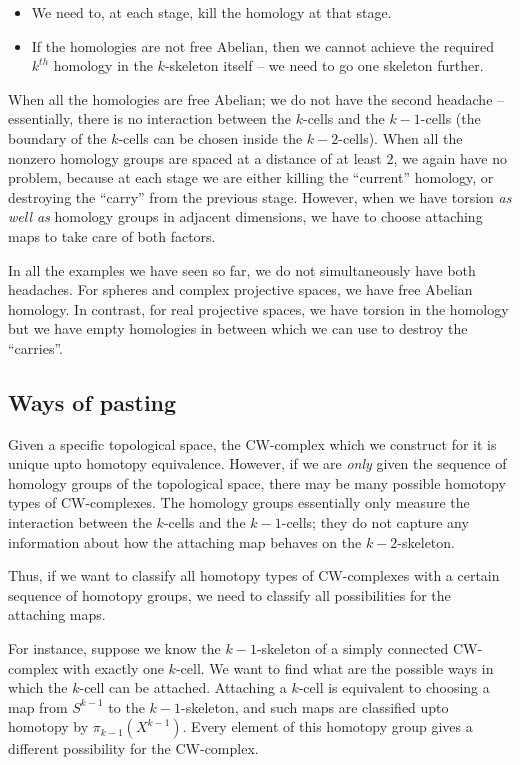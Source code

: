 \documentclass[a4paper]{amsart}
\begin{document}
\begin{itemize}

\item We need to, at each stage, kill the homology at that stage.

\item If the homologies are not free Abelian, then we cannot achieve
  the required $k^{th}$ homology in the $k$-skeleton itself -- we need
  to go one skeleton further.

\end{itemize}

When all the homologies are free Abelian; we do not have the second
headache -- essentially, there is no interaction between the $k$-cells
and the $k-1$-cells (the boundary of the $k$-cells can be chosen
inside the $k-2$-cells). When all the nonzero homology groups are
spaced at a distance of at least $2$, we again have no problem,
because at each stage we are either killing the ``current'' homology,
or destroying the ``carry'' from the previous stage. However, when we
have torsion {\em as well as} homology groups in adjacent dimensions,
we have to choose attaching maps to take care of both factors.

In all the examples we have seen so far, we do not simultaneously have
both headaches. For spheres and complex projective spaces, we have
free Abelian homology. In contrast, for real projective spaces, we
have torsion in the homology but we have empty homologies in between
which we can use to destroy the ``carries''.

\subsection{Ways of pasting}

Given a specific topological space, the CW-complex which we construct
for it is unique upto homotopy equivalence. However, if we are {\em
  only} given the sequence of homology groups of the topological
space, there may be many possible homotopy types of CW-complexes. The
homology groups essentially only measure the interaction between the
$k$-cells and the $k-1$-cells; they do not capture any information
about how the attaching map behaves on the $k-2$-skeleton.

Thus, if we want to classify all homotopy types of CW-complexes with a
certain sequence of homotopy groups, we need to classify all
possibilities for the attaching maps. 

For instance, suppose we know the $k-1$-skeleton of a simply connected
CW-complex with exactly one $k$-cell. We want to find what are the
possible ways in which the $k$-cell can be attached. Attaching a
$k$-cell is equivalent to choosing a map from $S^{k-1}$ to the
$k-1$-skeleton, and such maps are classified upto homotopy by
$\pi_{k-1}(X^{k-1})$. Every element of this homotopy group gives a
different possibility for the CW-complex.
\end{document}
